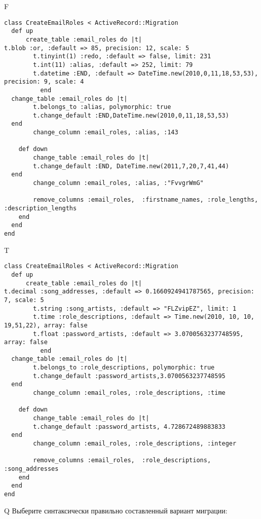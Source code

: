 F
\begin{verbatim}
class CreateEmailRoles < ActiveRecord::Migration
  def up
	  create_table :email_roles do |t|
t.blob :or, :default => 85, precision: 12, scale: 5
		t.tinyint(1) :redo, :default => false, limit: 231
		t.int(11) :alias, :default => 252, limit: 79
		t.datetime :END, :default => DateTime.new(2010,0,11,18,53,53), precision: 9, scale: 4
		  end
  change_table :email_roles do |t|
		t.belongs_to :alias, polymorphic: true
 		t.change_default :END,DateTime.new(2010,0,11,18,53,53)
  end
 		change_column :email_roles, :alias, :143
   
	def down
		change_table :email_roles do |t|
		t.change_default :END, DateTime.new(2011,7,20,7,41,44)
  end
 		change_column :email_roles, :alias, :"FvvgrWmG"
   
		remove_columns :email_roles,  :firstname_names, :role_lengths, :description_lengths 
    end 
  end
end

\end{verbatim}

T
\begin{verbatim}
class CreateEmailRoles < ActiveRecord::Migration
  def up
	  create_table :email_roles do |t|
t.decimal :song_addresses, :default => 0.1660924941787565, precision: 7, scale: 5
		t.string :song_artists, :default => "FLZvipEZ", limit: 1
		t.time :role_descriptions, :default => Time.new(2010, 10, 10, 19,51,22), array: false
		t.float :password_artists, :default => 3.0700563237748595, array: false
		  end
  change_table :email_roles do |t|
		t.belongs_to :role_descriptions, polymorphic: true
 		t.change_default :password_artists,3.0700563237748595
  end
 		change_column :email_roles, :role_descriptions, :time
   
	def down
		change_table :email_roles do |t|
		t.change_default :password_artists, 4.728672489883833
  end
 		change_column :email_roles, :role_descriptions, :integer
   
		remove_columns :email_roles,  :role_descriptions, :song_addresses 
    end 
  end
end

\end{verbatim}

Q
Выберите синтаксически правильно составленный вариант миграции:

